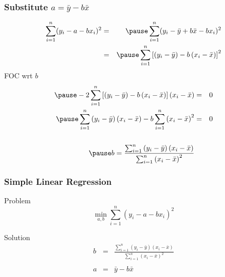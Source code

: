 \begin{frame}
  \frametitle{Substitute $a = \bar{y} - b \bar{x}$}
  \small
\begin{eqnarray*}
	\sum_{i=1}^n (y_i - a - b x_i)^2 &=& \pause\sum_{i=1}^n (y_i - \bar{y} + b\bar{x} - b x_i)^2\\
	&=&\pause\sum_{i=1}^n \left[ \left(y_i - \bar{y}\right) - b\left(x_i - \bar{x}\right) \right]^2
\end{eqnarray*}
\alert{FOC wrt $b$}
\begin{eqnarray*}\pause
	-2\sum_{i=1}^n \left[\left(y_i - \bar{y}\right) - b\left(x_i - \bar{x}\right) \right]\left(x_i - \bar{x} \right) &=& 0\\\pause
	\sum_{i=1}^n \left(y_i - \bar{y}\right)\left(x_i - \bar{x} \right) - b\sum_{i=1}^n \left(x_i - \bar{x}\right)^2 &=& 0\\ \\\pause
	b = \frac{\sum_{i=1}^n \left(y_i - \bar{y}\right)\left(x_i - \bar{x} \right)}{\sum_{i=1}^n \left(x_i - \bar{x}\right)^2}
\end{eqnarray*}
\end{frame}
\begin{frame}
\frametitle{Simple Linear Regression}
	\begin{block}{Problem}
	$$\min_{a,b}  \sum_{i=1}^n (y_i - a - b x_i)^2$$
\end{block}
\begin{block}{Solution}
	\begin{eqnarray*}
		b &=& \frac{\sum_{i=1}^n \left(y_i - \bar{y}\right)\left(x_i - \bar{x} \right)}{\sum_{i=1}^n \left(x_i - \bar{x}\right)^2}\\ \\
		a &=& \bar{y} - b\bar{x}
	\end{eqnarray*}
\end{block}
\end{frame}

